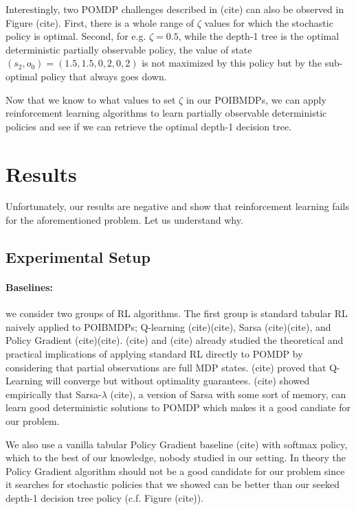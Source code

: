 Interestingly, two POMDP challenges described in (cite) can also be observed in Figure (cite). 
First, there is a whole range of $\zeta$ values for which the stochastic policy is optimal.
Second, for e.g. $\zeta=0.5$, while the depth-1 tree is the optimal deterministic partially observable policy, the value of state $(s_2, o_0) = (1.5, 1.5, 0, 2, 0, 2)$ is not maximized by this policy but by the sub-optimal policy that always goes down.

Now that we know to what values to set $\zeta$ in our POIBMDPs, we can apply reinforcement learning algorithms to learn partially observable deterministic policies and see if we can retrieve the optimal depth-1 decision tree.

\section{Results}

Unfortunately, our results are negative and show that reinforcement learning fails for the aforementioned problem. Let us understand why.

\subsection{Experimental Setup}

\paragraph{Baselines:} we consider two groups of RL algorithms. The first group is standard tabular RL naively applied to POIBMDPs; Q-learning (cite)(cite), Sarsa (cite)(cite), and Policy Gradient (cite)(cite).
(cite) and (cite) already studied the theoretical and practical implications of applying standard RL directly to POMDP by considering that partial observations are full MDP states.
(cite) proved that Q-Learning will converge but without optimality guarantees. 
(cite) showed empirically that Sarsa-$\lambda$ (cite), a version of Sarsa with some sort of memory, can learn good deterministic solutions to POMDP which makes it a good candiate for our problem.

We also use a vanilla tabular Policy Gradient baseline (cite) with softmax policy, which to the best of our knowledge, nobody studied in our setting.
In theory the Policy Gradient algorithm should not be a good candidate for our problem since it searches for stochastic policies that we showed can be better than our seeked depth-1 decision tree policy (c.f. Figure (cite)).

